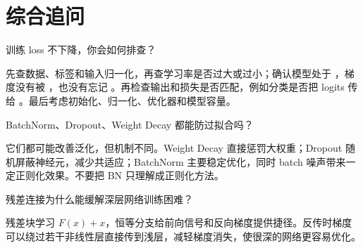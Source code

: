 \section{综合追问}
\begin{interview}
训练 loss 不下降，你会如何排查？
\end{interview}
\begin{answer}
先查数据、标签和输入归一化，再查学习率是否过大或过小；确认模型处于 ，梯度没有被 ，也没有忘记 。再检查输出和损失是否匹配，例如分类是否把 logits 传给 。最后考虑初始化、归一化、优化器和模型容量。
\end{answer}
\begin{interview}
BatchNorm、Dropout、Weight Decay 都能防过拟合吗？
\end{interview}
\begin{answer}
它们都可能改善泛化，但机制不同。Weight Decay 直接惩罚大权重；Dropout 随机屏蔽神经元，减少共适应；BatchNorm 主要稳定优化，同时 batch 噪声带来一定正则化效果。不要把 BN 只理解成正则化方法。
\end{answer}
\begin{interview}
残差连接为什么能缓解深层网络训练困难？
\end{interview}
\begin{answer}
残差块学习 $F(x)+x$，恒等分支给前向信号和反向梯度提供捷径。反传时梯度可以绕过若干非线性层直接传到浅层，减轻梯度消失，使很深的网络更容易优化。
\end{answer}
